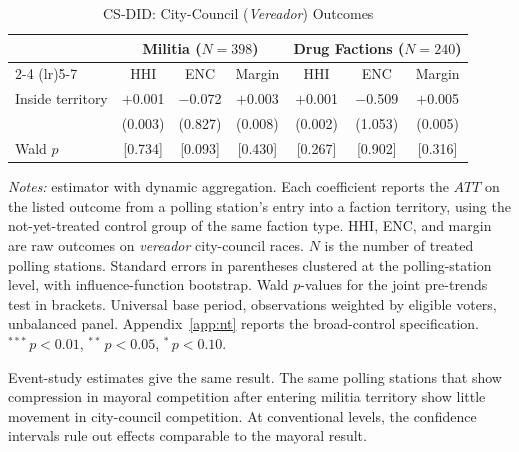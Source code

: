 \documentclass[11pt]{article}
\newcommand{\tabnotes}[1]{\par\vspace{3pt}\noindent\begin{minipage}{\linewidth}\footnotesize #1\end{minipage}}
\begin{document}
\begin{table}[H]
\centering
\caption{CS-DID: City-Council (\emph{Vereador}) Outcomes}\label{tab:csdid_vereador}
\footnotesize
\begin{tabular}{@{}l ccc ccc@{}}
\toprule
 & \multicolumn{3}{c}{\textbf{Militia} ($N = 398$)} & \multicolumn{3}{c}{\textbf{Drug Factions} ($N = 240$)} \\
\cmidrule(lr){2-4} \cmidrule(lr){5-7}
 & HHI & ENC & Margin & HHI & ENC & Margin \\
\midrule
Inside territory & $+$0.001 & $-$0.072 & $+$0.003 & $+$0.001 & $-$0.509 & $+$0.005 \\
                 & (0.003)  & (0.827)  & (0.008)  & (0.002)  & (1.053)  & (0.005) \\
Wald $p$         & [0.734]  & [0.093]  & [0.430]  & [0.267]  & [0.902]  & [0.316] \\
\bottomrule
\end{tabular}
\tabnotes{\textit{Notes:} \citet{callaway2021did} estimator with dynamic aggregation. Each coefficient reports the $\widehat{ATT}$ on the listed outcome from a polling station's entry into a faction territory, using the not-yet-treated control group of the same faction type. HHI, ENC, and margin are raw outcomes on \emph{vereador} city-council races. $N$ is the number of treated polling stations. Standard errors in parentheses clustered at the polling-station level, with influence-function bootstrap. Wald $p$-values for the joint pre-trends test in brackets. Universal base period, observations weighted by eligible voters, unbalanced panel. Appendix~\ref{app:nt} reports the broad-control specification. $^{***}\,p<0.01$, $^{**}\,p<0.05$, $^{*}\,p<0.10$.}
\end{table}

Event-study estimates give the same result. The same polling stations that show compression in mayoral competition after entering militia territory show little movement in city-council competition. At conventional levels, the confidence intervals rule out effects comparable to the mayoral result.
\end{document}
